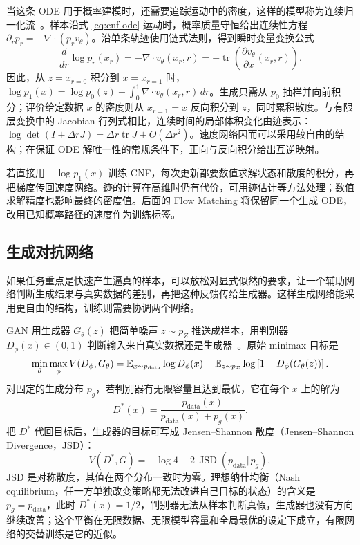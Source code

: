 当这条 ODE 用于概率建模时，还需要追踪运动中的密度，这样的模型称为连续归一化流~\cite{chen2018neuralode,grathwohl2019ffjord}。样本沿式 \eqref{eq:cnf-ode} 运动时，概率质量守恒给出连续性方程 \(\partial_r p_r=-\nabla\cdot(p_rv_\theta)\)。沿单条轨迹使用链式法则，得到瞬时变量变换公式
\begin{equation}
 \frac{d}{dr}\log p_r(x_r)
 =-\nabla\cdot v_\theta(x_r,r)
 =-\operatorname{tr}\!\left(\frac{\partial v_\theta}{\partial x}(x_r,r)\right).
 \label{eq:cnf-density}
\end{equation}
因此，从 \(z=x_{r=0}\) 积分到 \(x=x_{r=1}\) 时，\(\log p_1(x)=\log p_0(z)-\int_0^1\nabla\cdot v_\theta(x_r,r)\,dr\)。生成只需从 \(p_0\) 抽样并向前积分；评价给定数据 \(x\) 的密度则从 \(x_{r=1}=x\) 反向积分到 \(z\)，同时累积散度。与有限层变换中的 Jacobian 行列式相比，连续时间的局部体积变化由迹表示：\(\log\det(I+\Delta r J)=\Delta r\operatorname{tr}J+O(\Delta r^2)\)。速度网络因而可以采用较自由的结构；在保证 ODE 解唯一性的常规条件下，正向与反向积分给出互逆映射。

若直接用 \(-\log p_1(x)\) 训练 CNF，每次更新都要数值求解状态和散度的积分，再把梯度传回速度网络。迹的计算在高维时仍有代价，可用迹估计等方法处理；数值求解精度也影响最终的密度值。后面的 Flow Matching 将保留同一个生成 ODE，改用已知概率路径的速度作为训练标签。

\subsection{生成对抗网络}
\label{sec:gan}

如果任务重点是快速产生逼真的样本，可以放松对显式似然的要求，让一个辅助网络判断生成结果与真实数据的差别，再把这种反馈传给生成器。这样生成网络能采用更自由的结构，训练则需要协调两个网络。

GAN 用生成器 \(G_\theta(z)\) 把简单噪声 \(z\sim p_Z\) 推送成样本，用判别器 \(D_\phi(x)\in(0,1)\) 判断输入来自真实数据还是生成器~\cite{goodfellow2014gan}。原始 minimax 目标是
\begin{equation}
 \min_\theta\max_\phi V(D_\phi,G_\theta)
 =\mathbb{E}_{x\sim p_{\mathrm{data}}}\log D_\phi(x)
 +\mathbb{E}_{z\sim p_Z}\log\left[1-D_\phi(G_\theta(z))\right].
\end{equation}
对固定的生成分布 \(p_g\)，若判别器有无限容量且达到最优，它在每个 \(x\) 上的解为
\begin{equation}
 D^*(x)=\frac{p_{\mathrm{data}}(x)}
 {p_{\mathrm{data}}(x)+p_g(x)}.
\end{equation}
把 \(D^*\) 代回目标后，生成器的目标可写成 Jensen--Shannon 散度（Jensen--Shannon Divergence，JSD）：
\begin{equation}
 V(D^*,G)=-\log 4+
 2\,\operatorname{JSD}\!\left(p_{\mathrm{data}}\Vert p_g\right),
\end{equation}
JSD 是对称散度，其值在两个分布一致时为零。理想纳什均衡（Nash equilibrium，任一方单独改变策略都无法改进自己目标的状态）的含义是 \(p_g=p_{\mathrm{data}}\)，此时 \(D^*(x)=1/2\)，判别器无法从样本判断真假，生成器也没有方向继续改善；这个平衡在无限数据、无限模型容量和全局最优的设定下成立，有限网络的交替训练是它的近似。

